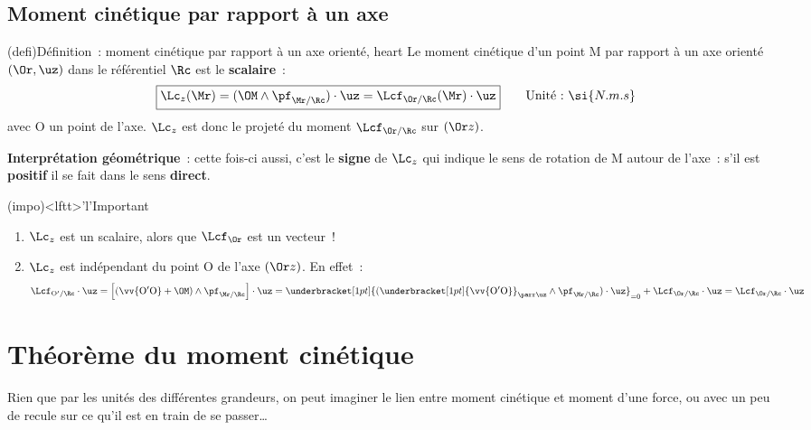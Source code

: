 \documentclass[../../main/main.tex]{subfiles}
\begin{document}
\subsection{Moment cinétique par rapport à un axe }
\begin{tcb*}(defi){Définition~: moment cinétique par rapport à un axe orienté, heart}
	Le moment cinétique d'un point M par rapport à un axe orienté $(\Or,\uz)$
	dans le référentiel $\Rc$ est le \textbf{scalaire}~:
	\[
		\boxed{\Lc_z(\Mr) = (\OM\wedge\pf_{\Mr/\Rc})\cdot\uz =
			\Lcf_{\Or/\Rc}(\Mr)\cdot\uz}
		\qquad
		\text{Unité~:~}
		\si{N.m.s}
	\]
	avec O un point de l'axe. $\Lc_z$ est donc le projeté du moment
	$\Lcf_{\Or/\Rc}$ sur $(\Or z)$.
\end{tcb*}

\textbf{Interprétation géométrique}~: cette fois-ci aussi, c'est le
\textbf{signe} de $\Lc_z$ qui indique le sens de rotation de M autour de l'axe~:
s'il est \textbf{positif} il se fait dans le sens \textbf{direct}.

\begin{tcb*}(impo)<lftt>'l'{Important}
	\begin{enumerate}
		\item $\Lc_z$ est un scalaire, alors que $\Lcf_{\Or}$ est un vecteur~!
		\item $\Lc_z$ est indépendant du point O de l'axe $(\Or z)$. En effet~:
		      \[
			      \Lcf_{\mathrm{O'}/\Rc}\cdot\uz =
			      \left[(\vv{\rm O'O}+\OM)\wedge\pf_{\Mr/\Rc}\right]\cdot\uz =
			      \underbracket[1pt]{
				      (\underbracket[1pt]{\vv{\rm O'O}}_{\parr\uz}\wedge\pf_{\Mr/\Rc})
				      \cdot\uz}_{=0}
			      + \Lcf_{\Or/\Rc}\cdot\uz = \Lcf_{\Or/\Rc}\cdot\uz
		      \]
	\end{enumerate}
	\vspace*{-30pt}
\end{tcb*}

\section{Théorème du moment cinétique}
Rien que par les unités des différentes grandeurs, on peut imaginer le lien
entre moment cinétique et moment d'une force, ou avec un peu de recule sur ce
qu'il est en train de se passer…
\end{document}

